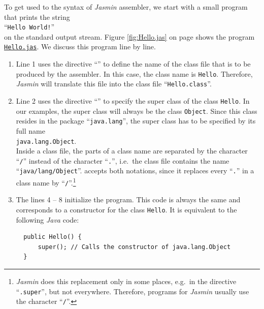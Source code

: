 \noindent
To get used to the syntax of \textsl{Jasmin} assembler, we start with a small program that prints the
string
\\[0.2cm]
\hspace*{1.3cm}
``\texttt{Hello World!}''
\\[0.2cm]
on the standard output stream.  Figure \ref{fig:Hello.jas} on page
\pageref{fig:Hello.jas} shows the program
\href{https://github.com/karlstroetmann/Formal-Languages/tree/master/Python/Chapter-12/Hello.jas}{\texttt{Hello.jas}}. 
We discuss this program line by line.
\begin{enumerate}
\item Line 1 uses the directive ``\texttt{}'' to define the name of the class file that is to
      be produced by the assembler.  
      In this case, the class name is \texttt{Hello}.  Therefore, \textsl{Jasmin} will translate
      this file into the class file ``\texttt{Hello.class}''.
\item Line 2 uses the directive ``\texttt{}'' to specify the super class of the class
      \texttt{Hello}.  In our examples, the super class will always be the class \texttt{Object}.
      Since this class resides in the package ``\texttt{java.lang}'', the super class has to be
      specified by its full name
      \\[0.2cm]
      \hspace*{1.3cm}
      \texttt{java.lang.Object}.
      \\[0.2cm]
      Inside a class file, the parts of a class name are separated by the character ``\texttt{/}''
      instead of the character ``\texttt{.}'', i.e.~the class file contains the name
      ``\texttt{java/lang/Object}''.   accepts both notations, since it replaces
      every ``\texttt{.}'' in a class name by ``\texttt{/}''.\footnote{
        \textsl{Jasmin} does this replacement only in some places, e.g.~in the directive
        ``\texttt{.super}'', but not everywhere.  Therefore, programs for \textsl{Jasmin} usually use
        the character ``\texttt{/}''.}
\item The lines 4 -- 8 initialize the program.  This code is always the same and corresponds to a
  constructor for the class \texttt{Hello}.  It is equivalent to the following \textsl{Java} code:

\begin{verbatim}
  public Hello() {
      super(); // Calls the constructor of java.lang.Object
  }
\end{verbatim}


\end{enumerate}
